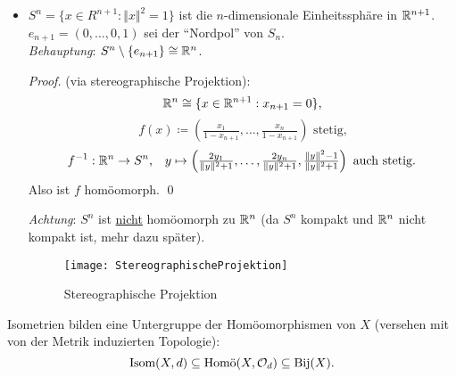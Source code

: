 \begin{example}
\begin{itemize}
\begin{proof}
        Analog für \( f^{-1} \). \qed{}
      \end{proof}
    \item \( S^n = \{ x \in R^{n+1} : \Vert x \Vert^2 = 1 \} \) ist die \( n \)-dimensionale Einheitssphäre in \( \mathbb{R}^{n+1} \). \\
      \( e_{n+1} = (0,\dots,0,1) \) sei der ``Nordpol'' von \( S_n \). \\
      \emph{Behauptung}: \( S^n\setminus \{ e_{n+1} \} \cong \mathbb{R}^n \).
      \begin{proof}
        (via stereographische Projektion):
        \begin{equation*}
          \mathbb{R}^n \cong \{ x \in \mathbb{R}^{n+1} : x_{n+1} = 0 \}\text{,}
        \end{equation*}
        \begin{equation*}
          f(x) \coloneqq (\tfrac{x_1}{1-x_{n+1}}, \dots, \tfrac{x_n}{1-x_{n+1}}) \text{ stetig,}
        \end{equation*}
        \begin{equation*}
          f^{-1}: \mathbb{R}^n \to S^n\text{,} \quad y \mapsto \left( \tfrac{2y_1}{\Vert y \Vert^2+1}, \dots, \tfrac{2y_n}{\Vert y \Vert^2+1}, \tfrac{\Vert y \Vert^2-1}{\Vert y \Vert^2+1} \right)\text{ auch stetig.}
        \end{equation*}
        Also ist \( f \) homöomorph. \qed{}
      \end{proof}
      \emph{Achtung}: \( S^n \) ist \underline{nicht} homöomorph zu \( \mathbb{R}^n \) (da \( S^n \) kompakt und \( \mathbb{R}^n \) nicht kompakt ist, mehr dazu später).
      \begin{figure}[H]
        \texttt{[image: StereographischeProjektion]}
        \caption{Stereographische Projektion}
      \end{figure}
  \end{itemize}
\end{example}

\begin{remark}
  Isometrien bilden eine Untergruppe der Homöomorphismen von \( X \) (versehen mit von der Metrik induzierten Topologie):
  \begin{equation*}
    \text{Isom}(X, d) \subseteq \text{Homö}(X, \mathcal{O}_d) \subseteq \text{Bij}(X)\text{.}
  \end{equation*}
\end{remark}

